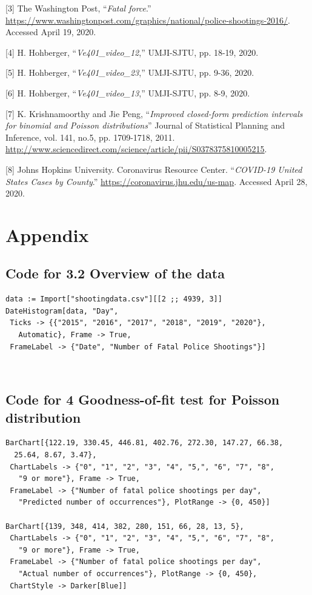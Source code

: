 \documentclass[a4paper]{article}
\begin{document}
[3] The Washington Post, “\textit{Fatal force}.” \url{https://www.washingtonpost.com/graphics/national/police-shootings-2016/}. Accessed April 19, 2020.

[4] H. Hohberger, “\textit{Ve401\_video\_12},” UMJI-SJTU, pp. 18-19, 2020.

[5] H. Hohberger, “\textit{Ve401\_video\_23},” UMJI-SJTU, pp. 9-36, 2020.

[6] H. Hohberger, “\textit{Ve401\_video\_13},” UMJI-SJTU, pp. 8-9, 2020.

[7] K. Krishnamoorthy and Jie Peng, “\textit{Improved closed-form prediction intervals for binomial and Poisson distributions}” Journal of Statistical Planning and Inference, vol. 141, no.5, pp. 1709-1718, 2011. \url{http://www.sciencedirect.com/science/article/pii/S0378375810005215}.

[8] Johns Hopkins University. Coronavirus Resource Center. “\textit{COVID-19 United States Cases by County}.” \url{https://coronavirus.jhu.edu/us-map}. Accessed April 28, 2020.

\newpage

\section{Appendix}
	\subsection{Code for 3.2 Overview of the data}
\begin{lstlisting}
data := Import["shootingdata.csv"][[2 ;; 4939, 3]]
DateHistogram[data, "Day", 
 Ticks -> {{"2015", "2016", "2017", "2018", "2019", "2020"}, 
   Automatic}, Frame -> True, 
 FrameLabel -> {"Date", "Number of Fatal Police Shootings"}]
\end{lstlisting}
\

	\subsection{Code for 4 Goodness-of-fit test for Poisson distribution}
\begin{lstlisting}
BarChart[{122.19, 330.45, 446.81, 402.76, 272.30, 147.27, 66.38, 
  25.64, 8.67, 3.47}, 
 ChartLabels -> {"0", "1", "2", "3", "4", "5,", "6", "7", "8", 
   "9 or more"}, Frame -> True, 
 FrameLabel -> {"Number of fatal police shootings per day", 
   "Predicted number of occurrences"}, PlotRange -> {0, 450}]

BarChart[{139, 348, 414, 382, 280, 151, 66, 28, 13, 5}, 
 ChartLabels -> {"0", "1", "2", "3", "4", "5,", "6", "7", "8", 
   "9 or more"}, Frame -> True, 
 FrameLabel -> {"Number of fatal police shootings per day", 
   "Actual number of occurrences"}, PlotRange -> {0, 450}, 
 ChartStyle -> Darker[Blue]]
\end{lstlisting}
\
\end{document}
